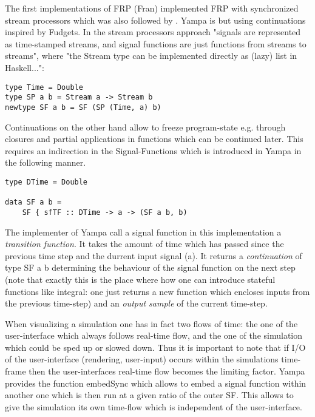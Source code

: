 The first implementations of FRP (Fran) implemented FRP with synchronized stream processors which was also followed by \cite{wan_functional_2000}. Yampa is but using continuations inspired by Fudgets. In the stream processors approach "signals are represented as time-stamped streams, and signal functions are just functions from streams to streams", where "the Stream type can be implemented directly as (lazy) list in Haskell...":
\begin{lstlisting}[frame=single]
type Time = Double
type SP a b = Stream a -> Stream b
newtype SF a b = SF (SP (Time, a) b)
\end{lstlisting}
Continuations on the other hand allow to freeze program-state e.g. through closures and partial applications in functions which can be continued later. This requires an indirection in the Signal-Functions which is introduced in Yampa in the following manner. 
\begin{lstlisting}[frame=single]
type DTime = Double

data SF a b = 
	SF { sfTF :: DTime -> a -> (SF a b, b)
\end{lstlisting}
The implementer of Yampa call a signal function in this implementation a \textit{transition function}. It takes the amount of time which has passed since the previous time step and the durrent input signal (a). It returns a \textit{continuation} of type SF a b determining the behaviour of the signal function on the next step (note that exactly this is the place where how one can introduce stateful functions like integral: one just returns a new function which encloses inputs from the previous time-step) and an \textit{output sample} of the current time-step. 

When visualizing a simulation one has in fact two flows of time: the one of the user-interface which always follows real-time flow, and the one of the simulation which could be sped up or slowed down. Thus it is important to note that if I/O of the user-interface (rendering, user-input) occurs within the simulations time-frame then the user-interfaces real-time flow becomes the limiting factor. Yampa provides the function embedSync which allows to embed a signal function within another one which is then run at a given ratio of the outer SF. This allows to give the simulation its own time-flow which is independent of the user-interface. 